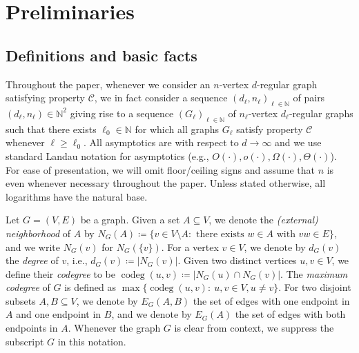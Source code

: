 \documentclass[reqno,a4paper,11pt]{amsart}
\begin{document}
\section{Preliminaries} \label{sec:prelim}

\subsection{Definitions and basic facts}
Throughout the paper, whenever we consider an $n$-vertex $d$-regular graph satisfying property $\mathcal{C}$, we in fact consider a sequence $(d_{\ell}, n_{\ell})_{\ell \in\mathbb{N}}$ of pairs $(d_{\ell},n_{\ell})\in \mathbb{N}^2$ giving rise to a sequence $(G_{\ell})_{\ell \in\mathbb{N}}$ of $n_{\ell}$-vertex $d_{\ell}$-regular graphs such that there exists $\ell_0 \in\mathbb{N}$ for which all graphs $G_{\ell}$ satisfy property $\mathcal{C}$ whenever $\ell \geq \ell_0$. All asymptotics are with respect to $d \to \infty$ and we use standard Landau notation for asymptotics (e.g., $O(\cdot), o(\cdot), \Omega(\cdot), \Theta(\cdot)$).
For ease of presentation, we will omit floor/ceiling signs and assume that $n$ is even whenever necessary throughout the paper. Unless stated otherwise, all logarithms have the natural base.

Let $G=(V,E)$ be a graph. Given a set $A \subseteq V$, we denote the \emph{(external) neighborhood} of $A$ by $N_G(A) \coloneqq \{v \in V \setminus A : \text{ there exists } w \in A \text{ with } vw \in E\}$, and we write $N_G(v)$ for $N_G(\{v\})$. For a vertex $v \in V$, we denote by $d_G(v)$ the \emph{degree} of $v$, i.e., $d_G(v)\coloneqq|N_G(v)|$. Given two distinct vertices $u,v\in V$, we define their \textit{codegree} to be $\operatorname{codeg}(u,v)\coloneqq |N_G(u)\cap N_G(v)|$.  
The \textit{maximum codegree} of $G$ is defined as $\max\{\operatorname{codeg}(u,v):\ u,v\in V, u\neq v\}$. 
For two disjoint subsets $A, B\subseteq V$, we denote by $E_G(A, B)$ the set of edges with one endpoint in $A$ and one endpoint in $B$, and we denote by $E_G(A)$ the set of edges with both endpoints in $A$.
Whenever the graph $G$ is clear from context, we suppress the subscript $G$ in this notation.
\end{document}
